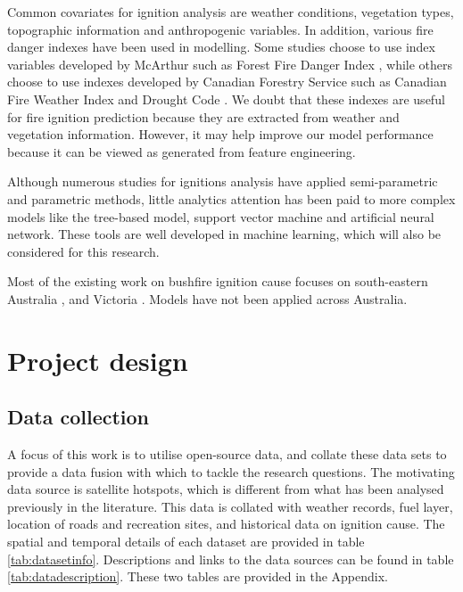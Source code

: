 \documentclass[11pt,a4paper,]{article}
\begin{document}
Common covariates for ignition analysis are weather conditions, vegetation types, topographic information and anthropogenic variables. In addition, various fire danger indexes have been used in modelling. Some studies choose to use index variables developed by McArthur such as Forest Fire Danger Index \autocite{clarke2019developing,read2018lightning}, while others choose to use indexes developed by Canadian Forestry Service such as Canadian Fire Weather Index and Drought Code \autocite{plucinski2014predicting}. We doubt that these indexes are useful for fire ignition prediction because they are extracted from weather and vegetation information. However, it may help improve our model performance because it can be viewed as generated from feature engineering.

Although numerous studies for ignitions analysis have applied semi-parametric and parametric methods, little analytics attention has been paid to more complex models like the tree-based model, support vector machine and artificial neural network. These tools are well developed in machine learning, which will also be considered for this research.

Most of the existing work on bushfire ignition cause focuses on south-eastern Australia \autocite{clarke2019developing}, and Victoria \autocite{read2018lightning}. Models have not been applied across Australia.

\hypertarget{project-design}{%
\section{Project design}\label{project-design}}

\hypertarget{data-collection}{%
\subsection{Data collection}\label{data-collection}}

A focus of this work is to utilise open-source data, and collate these data sets to provide a data fusion with which to tackle the research questions. The motivating data source is satellite hotspots, which is different from what has been analysed previously in the literature. This data is collated with weather records, fuel layer, location of roads and recreation sites, and historical data on ignition cause. The spatial and temporal details of each dataset are provided in table \ref{tab:datasetinfo}. Descriptions and links to the data sources can be found in table \ref{tab:datadescription}. These two tables are provided in the Appendix.
\end{document}
